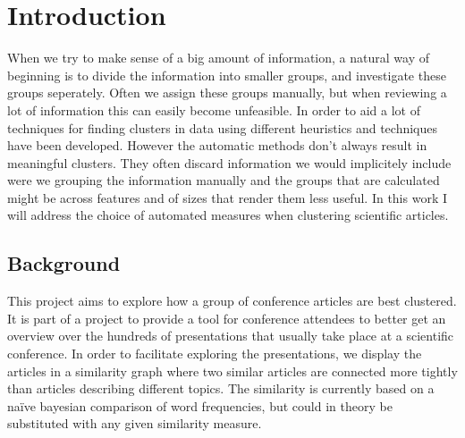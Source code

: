 \section{Introduction}

When we try to make sense of a big amount of information, a natural way 
of beginning is to divide the information into smaller groups, and 
investigate these groups seperately. Often we assign these groups 
manually, but when reviewing a lot of information this can easily become 
unfeasible. In order to aid a lot of techniques for finding clusters in 
data using different heuristics and techniques have been developed.  
However the automatic methods don't always result in meaningful 
clusters. They often discard information we would implicitely include 
were we grouping the information manually and the groups that are 
calculated might be across features and of sizes that render them less 
useful. In this work I will address the choice of automated measures 
when clustering scientific articles.

\subsection{Background}

This project aims to explore how a group of conference articles are best 
clustered. It is part of a project to provide a tool for conference 
attendees to better get an overview over the hundreds of presentations 
that usually take place at a scientific conference. In order to 
facilitate exploring the presentations, we display the articles in a 
similarity graph where two similar articles are connected more tightly 
than articles describing different topics. The similarity is currently 
based on a na\"{i}ve bayesian comparison of word frequencies, but could 
in theory be substituted with any given similarity measure.

